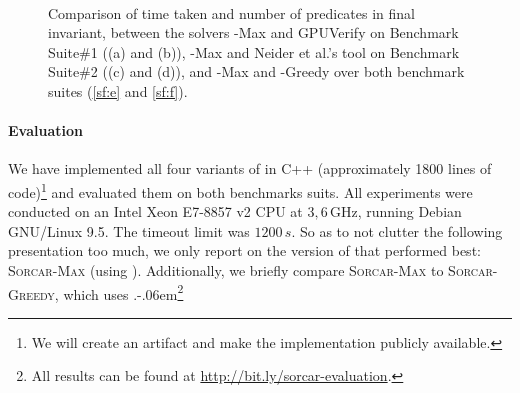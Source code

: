 \begin{figure}
    \\

    \caption{Comparison of time taken and number of predicates in final invariant, between the solvers \mbox{\sorcar-Max} and GPUVerify on Benchmark Suite\#1 ((a) and (b)), \mbox{\sorcar-Max} and Neider et al.'s tool on Benchmark Suite\#2 ((c) and (d)), and \mbox{\sorcar-Max} and \sorcar-Greedy over both benchmark suites (\ref{sf:e} and \ref{sf:f}).}
    \label{fig:results}
\end{figure}




\paragraph{Evaluation}
We have implemented all four variants of \sorcar in C+\!+ (approximately 1800 lines of code)\footnote{We will create an artifact and make the implementation publicly available.} and evaluated them on both benchmarks suits.
All experiments were conducted on an Intel Xeon E7-8857 v2 CPU at $3,6\,\text{GHz}$, running Debian GNU/Linux 9.5.
The timeout limit was $1200\,s$.
So as to not clutter the following presentation too much, we only report on the version of \sorcar that performed best: \textsc{Sorcar-Max} (using \RelevantPredicatesMax).
Additionally, we briefly compare \textsc{Sorcar-Max} to \textsc{Sorcar-Greedy}, which uses \RelevantPredicatesGreedy.\kern-.06em\footnote{All results can be found at \url{http://bit.ly/sorcar-evaluation}.}

